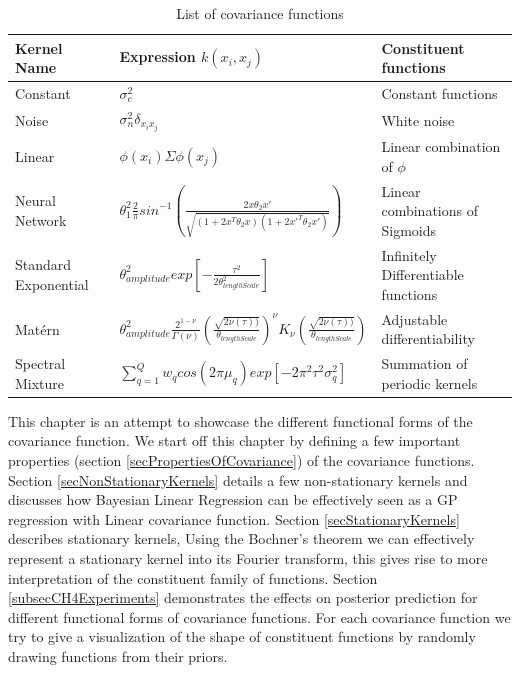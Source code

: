 \begin{table}[!ht]
    \centering
\begin{tabularx}{\textwidth}{|l|l|X|}
  \hline
Kernel Name  & Expression $k(x_{i}, x_{j})$ & Constituent functions \\
  \hline 
  \hline
Constant & \small $\sigma_{c}^2$ & Constant functions \normalsize\\
Noise & \small $\sigma_{n}^2\delta_{x_{i}x_{j}}$ & White noise \normalsize\\
Linear & \small $\phi(x_{i})\Sigma\phi(x_{j})$ & Linear combination of $\phi$ \normalsize\\
Neural Network & \small $\theta_{1}^{2}\frac{2}{\pi} sin^{-1}\left ( \frac{2x\theta_{2}x'}{\sqrt{(1+2x^{T}\theta_{2}x)(1+2x'^{T}\theta_{2}x')}} \right )$ & Linear combinations of Sigmoids \normalsize\\
Standard Exponential & \small $\theta_{amplitude}^2exp[-\frac{\tau^2}{2\theta_{lengthScale}^2}]$ & Infinitely Differentiable functions \normalsize\\ 
Mat\'ern & \small $\theta_{amplitude}^2\frac{2^{1- \nu }}{\Gamma (\nu)}\left ( \frac{\sqrt{2\nu(\tau))}}{\theta_{lengthScale}} \right )^{\nu}K_{\nu}\left ( \frac{\sqrt{2\nu(\tau))}}{\theta_{lengthScale}} \right)$ & Adjustable differentiability \normalsize\\
Spectral Mixture & \small  $\sum_{q=1}^{Q}w_{q}cos(2\pi\mu_{q}) exp[-2\pi^{2}\tau^{2}\sigma_{q}^2]$ & Summation of periodic kernels \normalsize\\
   \hline
\end{tabularx}
  \label{tabListOfCovarianceFUnctions}
  \caption{List of covariance functions}
  \end{table}
  
This chapter is an attempt to showcase the different functional forms of the covariance function. We start off this chapter by defining a few important properties (section \ref{secPropertiesOfCovariance}) of the covariance functions. Section \ref{secNonStationaryKernels} details a few non-stationary kernels and discusses how Bayesian Linear Regression can be effectively seen as a GP regression with Linear covariance function. Section \ref{secStationaryKernels} describes stationary kernels, Using the Bochner's theorem we can effectively represent a stationary kernel into its Fourier transform, this gives rise to more interpretation of the constituent family of functions. Section \ref{subsecCH4Experiments} demonstrates the effects on posterior prediction for different functional forms of covariance functions. For each covariance function we try to give a visualization of the shape of constituent functions by randomly drawing functions from their priors. 

